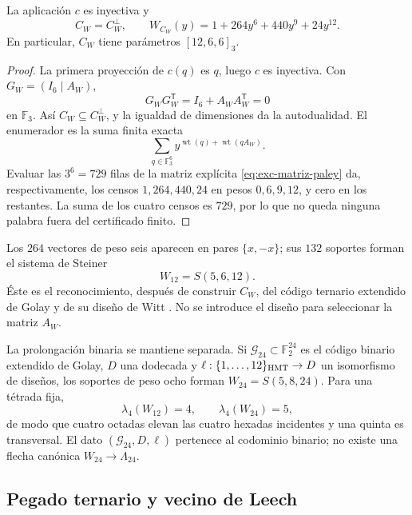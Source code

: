 \begin{theorem}
\label{thm:exc-codigo-ternario}
La aplicación \(c\) es inyectiva y
\begin{equation}
 C_W=C_W^\perp,
 \qquad
 W_{C_W}(y)=1+264y^6+440y^9+24y^{12}.
 \label{eq:exc-enumerador-cw}
\end{equation}
En particular, \(C_W\) tiene parámetros \([12,6,6]_3\).
\end{theorem}

\begin{proof}
La primera proyección de \(c(q)\) es \(q\), luego \(c\) es inyectiva.
Con \(G_W=(I_6\mid A_W)\),
\[
 G_WG_W^{\mathsf T}=I_6+A_WA_W^{\mathsf T}=0
\]
en \(\mathbb F_3\). Así \(C_W\subseteq C_W^\perp\), y la igualdad de
dimensiones da la autodualidad. El enumerador es la suma finita exacta
\[
 \sum_{q\in\mathbb F_3^6}
 y^{\operatorname{wt}(q)+\operatorname{wt}(qA_W)}.
\]
Evaluar las \(3^6=729\) filas de la matriz explícita
\eqref{eq:exc-matriz-paley} da, respectivamente, los censos
\(1,264,440,24\) en pesos \(0,6,9,12\), y cero en los restantes. La suma
de los cuatro censos es \(729\), por lo que no queda ninguna palabra fuera
del certificado finito.
\end{proof}

Los \(264\) vectores de peso seis aparecen en pares \(\{x,-x\}\); sus
\(132\) soportes forman el sistema de Steiner
\begin{equation}
 W_{12}=S(5,6,12).
 \label{eq:exc-w12}
\end{equation}
Éste es el reconocimiento, después de construir \(C_W\), del código ternario
extendido de Golay y de su diseño de Witt
\citep{MacWilliamsSloane1977,ConwaySloane1999}. No se introduce el diseño
para seleccionar la matriz \(A_W\).

La prolongación binaria se mantiene separada. Si
\(\mathcal G_{24}\subset\mathbb F_2^{24}\) es el código binario extendido
de Golay, \(D\) una dodecada y
\(\ell:\{1,\ldots,12\}_{\rm HMT}\to D\) un isomorfismo de diseños, los
soportes de peso ocho forman \(W_{24}=S(5,8,24)\). Para una tétrada fija,
\[
 \lambda_4(W_{12})=4,
 \qquad
 \lambda_4(W_{24})=5,
\]
de modo que cuatro octadas elevan las cuatro hexadas incidentes y una quinta
es transversal. El dato \((\mathcal G_{24},D,\ell)\) pertenece al codominio
binario; no existe una flecha canónica \(W_{24}\to\Lambda_{24}\).

\subsection{Pegado ternario y vecino de Leech}

